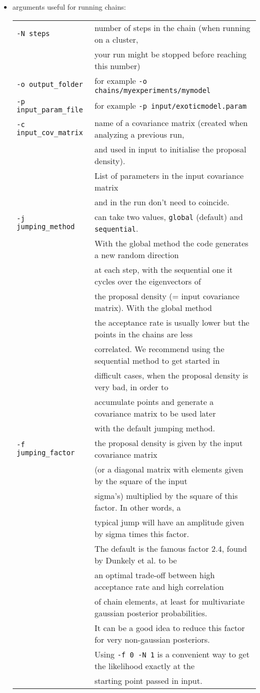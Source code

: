 \documentclass[10pt]{article}
\begin{document}
\begin{itemize}
\item arguments  useful for running chains:\\
\begin{tabular}{ll}
\verb?-N steps? & number of steps in the chain (when running on a cluster,\\& your run might be stopped before reaching this number)\\
\verb?-o output_folder? &for example \verb?-o chains/myexperiments/mymodel?\\
\verb?-p input_param_file?&for example \verb?-p input/exoticmodel.param?\\
\verb?-c input_cov_matrix?& name of a covariance matrix (created when analyzing a previous run,\\&and used in input to initialise the proposal density). \\&List of parameters in the input covariance matrix \\&and in the run don't need to coincide.\\
\verb?-j jumping_method? & can take two values, \verb?global? (default) and \verb?sequential?.\\& With the global method the code generates a new random direction \\& at each step, with the sequential one it cycles over the eigenvectors of \\&the proposal density (= input covariance matrix). With the global method\\& the acceptance rate is usually lower but the points in the chains are less\\& correlated.  We recommend using the sequential method to get started in\\& difficult cases, when the proposal density is very bad, in order to \\& accumulate points and generate a covariance matrix to be used later \\&with the default jumping method.\\
\verb?-f jumping_factor? & the proposal density is given by the input covariance matrix \\&(or a diagonal matrix with elements given by the square of the input \\&sigma's) multiplied by the square of this factor. In other words, a \\& typical jump will have an amplitude given by sigma times this factor. \\&The default is the famous factor 2.4, found by Dunkely et al. to be\\& an optimal trade-off between high acceptance rate and high correlation\\& of chain elements, at least for multivariate gaussian posterior probabilities.\\& It can be a good idea to reduce this factor for very non-gaussian posteriors. \\&Using \verb?-f 0 -N 1? is a convenient way to get the likelihood exactly at the \\& starting point passed in input. \\

\end{tabular}
\end{itemize}
\end{document}
